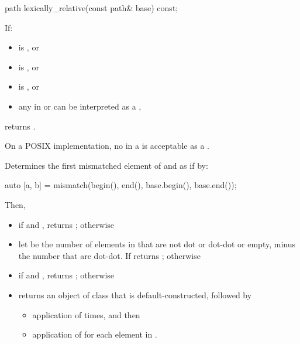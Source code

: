 %
\begin{itemdecl}
path lexically_relative(const path& base) const;
\end{itemdecl}

\begin{itemdescr}
\pnum
\effects
If:
\begin{itemize}
\item
{} is , or

\item
{} is , or

\item
{} is , or

\item
any  in
 or 
can be interpreted as a ,
\end{itemize}
returns .
\begin{note}
On a POSIX implementation, no  in a  is acceptable as a .
\end{note}
Determines the first mismatched element of  and 
as if by:
\begin{codeblock}
auto [a, b] = mismatch(begin(), end(), base.begin(), base.end());
\end{codeblock}
Then,
\begin{itemize}
\item if  and , returns ; otherwise
\item
  let  be the number of  elements in 
  that are not dot or dot-dot or empty, minus the number that are dot-dot.
If  returns ; otherwise
\item
  if  and ,
  returns ; otherwise
\item returns an object of class  that is default-constructed, followed by
\begin{itemize}
\item application of 
   times, and then
\item application of 
  for each element in .
\end{itemize}
\end{itemize}


\end{itemdescr}
